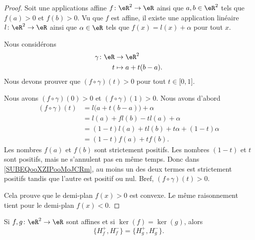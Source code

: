 \begin{proof}
    Soit une applications affine \( f\colon \eR^2\to\eR\) ainsi que \( a,b\in \eR^2\) tels que \( f(a)>0\) et \( f(b)>0\). Vu que \( f\) est affine, il existe une application linéaire \( l\colon \eR^2\to \eR\) ainsi que \( \alpha\in \eR\) tels que \( f(x)=l(x)+\alpha\) pour tout \( x\).
    
    Nous considérons
    \begin{equation}
        \begin{aligned}
            \gamma\colon \eR&\to \eR^2 \\
            t&\mapsto a+t(b-a). 
        \end{aligned}
    \end{equation}
    Nous devons prouver que \( (f\circ\gamma)(t)>0\) pour tout \( t\in\mathopen[ 0 , 1 \mathclose]\).

    Nous avons \( (f\circ\gamma)(0)>0\) et \( (f\circ\gamma)(1)>0\). Nous avons d'abord
    \begin{subequations}
        \begin{align}
            (f\circ\gamma)(t)&=l\big( a+t(b-a) \big)+\alpha\\
            &=l(a)+fl(b)-tl(a)+\alpha\\
            &=(1-t)l(a)+tl(b)+t\alpha+(1-t)\alpha\\
            &=(1-t)f(a)+tf(b).      \label{SUBEQooXZIPooMoJCRm}
        \end{align}
    \end{subequations}
    Les nombres \( f(a)\) et \( f(b)\) sont strictement positifs. Les nombres \( (1-t)\) et \( t\) sont positifs, mais ne s'annulent pas en même temps. Donc dans \eqref{SUBEQooXZIPooMoJCRm}, au moins un des deux termes est strictement positifs tandis que l'autre est positif ou nul. Bref, \( (f\circ\gamma)(t)>0\).

    Cela prouve que le demi-plan \( f(x)>0\) est convexe. Le même raisonnement tient pour le demi-plan \( f(x)<0\).
\end{proof}

\begin{lemma}        \label{LEMooXLNZooFyqPxG}
    Si \( f,g\colon \eR^2\to \eR\) sont affines et si \( \ker(f)=\ker(g)\), alors
    \begin{equation}
        \{H_f^+,H_f^-\}=\{ H_g^+,H_g^- \}.
    \end{equation}
\end{lemma}

